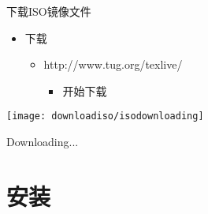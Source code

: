 \documentclass[fontset = none, t]{ctexbeamer}
\begin{document}
\begin{frame}{下载\TeXLive}{ISO镜像文件}
  \begin{itemize}
  \item 下载
    \begin{itemize}
    \item
      http://www.tug.org/texlive/
      \begin{itemize}
      \item 开始下载
      \end{itemize}      
    \end{itemize}
  \end{itemize}
  \centering
  \vfill
  \texttt{[image: downloadiso/isodownloading]}
  \vfill
\end{frame}
\begin{frame}
  Downloading...
\end{frame}

\section[安装\TeXLive]{安装\TeXLive}
\end{document}
